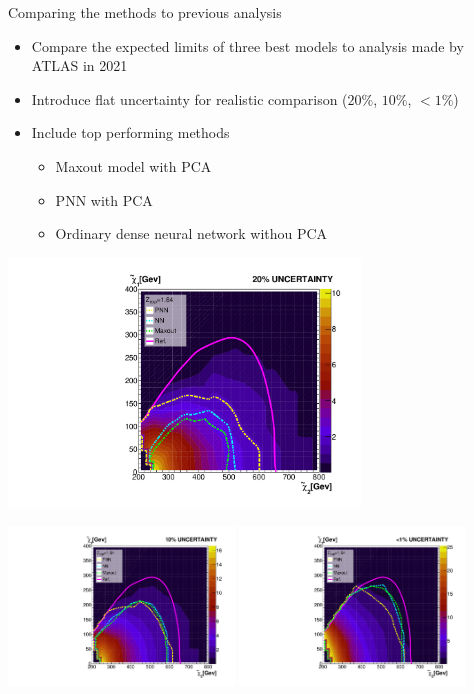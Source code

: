 \documentclass[UKenglish]{beamer}
\begin{document}
\begin{frame}{Comparing the methods to previous analysis}
    \begin{itemize}
        \item Compare the expected limits of three best models
              to analysis made by ATLAS in 2021 \cite{atlas_search_2021}
        \item Introduce flat uncertainty for realistic comparison ($20\%$, $10\%$, $<1\%$) 
        \item Include top performing methods
        \begin{itemize}
            \item Maxout model with PCA
            \item PNN with PCA
            \item Ordinary dense neural network withou PCA
        \end{itemize}
    \end{itemize}
\end{frame}
\begin{frame}
    \centering
    \includegraphics[width=0.7\textwidth]{figures/Limits/compLimit20.pdf}
\end{frame}
\begin{frame}
    \vfill
    \centering
    \includegraphics[width=0.45\textwidth]{figures/Limits/compLimit10.pdf}
    \includegraphics[width=0.45\textwidth]{figures/Limits/compLimit1.pdf}
\end{frame}
\end{document}
